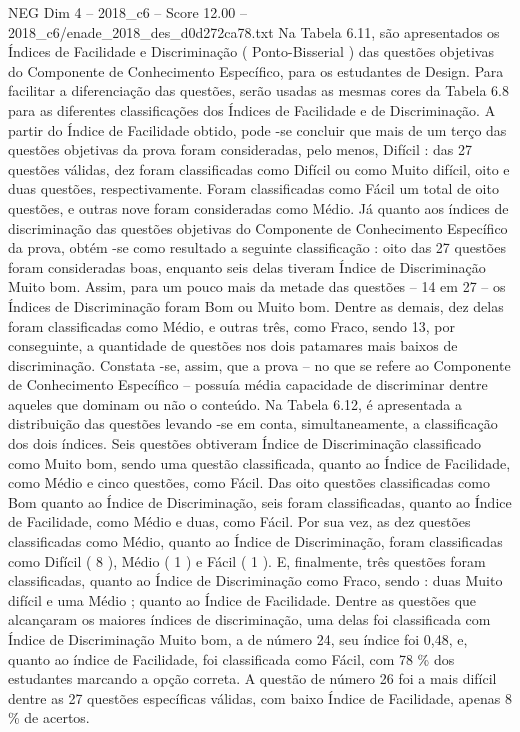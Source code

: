 \begin{textsample}{NEG Dim 4 – 2018\_c6 – Score 12.00 – 2018\_c6/enade\_2018\_des\_d0d272ca78.txt}
Na Tabela 6.11, são apresentados os Índices de Facilidade e Discriminação ( Ponto-Bisserial ) das questões objetivas do Componente de Conhecimento Específico, para os estudantes de Design.
Para facilitar a diferenciação das questões, serão usadas as mesmas cores da Tabela 6.8 para as diferentes classificações dos Índices de Facilidade e de Discriminação.
A partir do Índice de Facilidade obtido, pode -se concluir que mais de um terço das questões objetivas da prova foram consideradas, pelo menos, Difícil : das 27 questões válidas, dez foram classificadas como Difícil ou como Muito difícil, oito e duas questões, respectivamente.
Foram classificadas como Fácil um total de oito questões, e outras nove foram consideradas como Médio.
Já quanto aos índices de discriminação das questões objetivas do Componente de Conhecimento Específico da prova, obtém -se como resultado a seguinte classificação : oito das 27 questões foram consideradas boas, enquanto seis delas tiveram Índice de Discriminação Muito bom.
Assim, para um pouco mais da metade das questões – 14 em 27 – os Índices de Discriminação foram Bom ou Muito bom.
Dentre as demais, dez delas foram classificadas como Médio, e outras três, como Fraco, sendo 13, por conseguinte, a quantidade de questões nos dois patamares mais baixos de discriminação.
Constata -se, assim, que a prova – no que se refere ao Componente de Conhecimento Específico – possuía média capacidade de discriminar dentre aqueles que dominam ou não o conteúdo.
Na Tabela 6.12, é apresentada a distribuição das questões levando -se em conta, simultaneamente, a classificação dos dois índices.
Seis questões obtiveram Índice de Discriminação classificado como Muito bom, sendo uma questão classificada, quanto ao Índice de Facilidade, como Médio e cinco questões, como Fácil.
Das oito questões classificadas como Bom quanto ao Índice de Discriminação, seis foram classificadas, quanto ao Índice de Facilidade, como Médio e duas, como Fácil.
Por sua vez, as dez questões classificadas como Médio, quanto ao Índice de Discriminação, foram classificadas como Difícil ( 8 ), Médio ( 1 ) e Fácil ( 1 ).
E, finalmente, três questões foram classificadas, quanto ao Índice de Discriminação como Fraco, sendo : duas Muito difícil e uma Médio ; quanto ao Índice de Facilidade.
Dentre as questões que alcançaram os maiores índices de discriminação, uma delas foi classificada com Índice de Discriminação Muito bom, a de número 24, seu índice foi 0,48, e, quanto ao índice de Facilidade, foi classificada como Fácil, com 78 \% dos estudantes marcando a opção correta.
A questão de número 26 foi a mais difícil dentre as 27 questões específicas válidas, com baixo Índice de Facilidade, apenas 8 \% de acertos.

\end{textsample}
